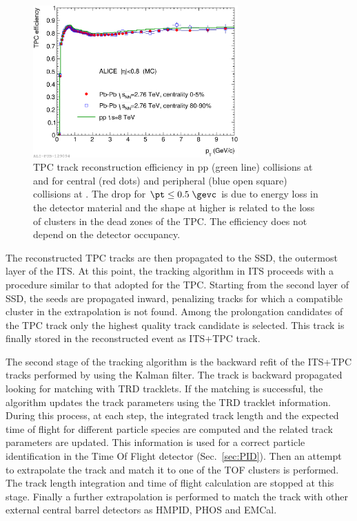 \begin{figure}
    \centering
    \includegraphics[width=0.7\textwidth]{gfx/tpc_rec_eff}
	\caption{TPC track reconstruction efficiency in pp (green line) collisions at \sotev and for central (red dots) and peripheral (blue open square) \PbPb collisions at \sdtev. The drop for $\pt \leq 0.5\; \gevc$ is due to energy loss in the detector material and the shape at higher \pt is related to the loss of clusters in the dead zones of the TPC. The efficiency does not depend on the detector occupancy.}
	\label{fig:reconstruction}
\end{figure}

The reconstructed TPC tracks are then propagated to the SSD, the outermost layer of the ITS.
At this point, the tracking algorithm in ITS proceeds with a procedure similar to that adopted
for the TPC. 
Starting from the second layer of SSD, the seeds are propagated inward, penalizing tracks
for which a compatible cluster in the extrapolation is not found.
Among the prolongation candidates of the TPC track only the highest quality track candidate is
selected. This track is finally stored in the reconstructed event as ITS+TPC track.

The second stage of the tracking algorithm is the backward refit of the ITS+TPC tracks performed by
using the Kalman filter.
The track is backward propagated looking for matching with TRD tracklets. If the matching is
successful, the algorithm updates the track parameters using the TRD tracklet information. 
During this process, at each step, the integrated track length and the expected time of flight
for different particle species are computed and the related track parameters are updated.
This information is used for a correct particle identification in the Time Of Flight detector
(Sec.~\ref{sec:PID}).
Then an attempt to extrapolate the track and match it to one of the TOF clusters is performed.
The track length integration and time of flight calculation are stopped at this stage.
Finally a further extrapolation is performed to match the track with other external central
barrel detectors as HMPID, PHOS and EMCal.

